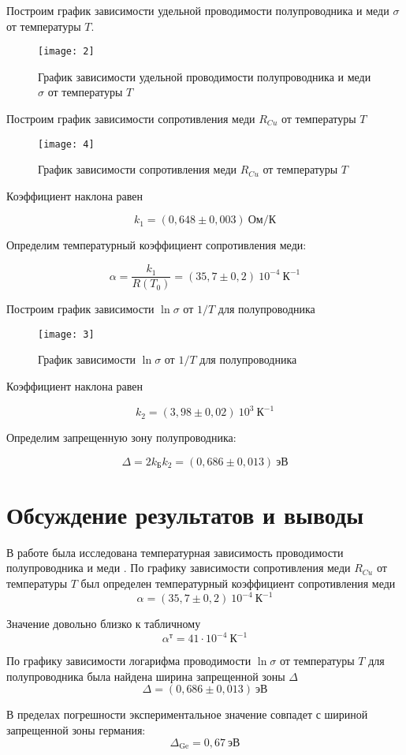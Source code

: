\documentclass[a4paper, 12pt]{article}
\begin{document}
\restoregeometry

Построим график зависимости удельной проводимости полупроводника и
меди $\sigma$ от температуры $T$.


\begin{figure}[H]
    \texttt{[image: 2]} 
    \caption{График зависимости удельной проводимости полупроводника и
меди $\sigma$ от температуры $T$}
\label{fig:2}
\end{figure}

Построим график зависимости сопротивления меди $R_{Cu}$ от температуры
$T$


\begin{figure}[H]
    \texttt{[image: 4]} 
    \caption{График зависимости сопротивления меди $R_{Cu}$ от температуры
$T$}
\label{fig:3}
\end{figure}

Коэффициент наклона равен 

\[
    k_{1} = (0,648 \pm 0,003)\: Ом/К
\]

Определим температурный коэффициент сопротивления меди:

\[
    \alpha = \dfrac{k_{1}}{R(T_{0})} = (35,7 \pm 0,2)\:10^{-4}\: К^{-1}
\]

Построим график зависимости $\ln \sigma$ от $1/T$ для полупроводника

\begin{figure}[H]
    \texttt{[image: 3]} 
    \caption{График зависимости $\ln \sigma$ от $1/T$ для полупроводника}
    \label{fig:4}
\end{figure}


Коэффициент наклона равен 

\[
    k_{2} = (3,98 \pm 0,02)\: 10^{3}\: К^{-1}
\]

Определим запрещенную зону полупроводника:

\[
    \Delta = 2 k_{Б} k_{2} = (0,686 \pm 0,013)\: эВ
\]













\section{Обсуждение результатов и выводы}


В работе была исследована температурная зависимость проводимости
полупроводника и меди . По графику зависимости
сопротивления меди $R_{Cu}$ от температуры $T$  был
определен температурный коэффициент сопротивления меди
\[
    \alpha = (35,7 \pm 0,2)\:10^{-4}\: К^{-1}
\]

Значение довольно близко к табличному 
\[
    \alpha^т = 41\cdot 10^{-4}\: К^{-1}
\]

По графику зависимости логарифма проводимости $\ln \sigma$ от
температуры $T$ для полупроводника была найдена ширина запрещенной
зоны $\Delta$
\[
    \Delta = (0,686 \pm 0,013)\: эВ
\]

В пределах погрешности экспериментальное значение совпадет с шириной
запрещенной зоны германия:
\[
    \Delta_{\text{Ge}} = 0,67\: эВ
\]
\end{document}
